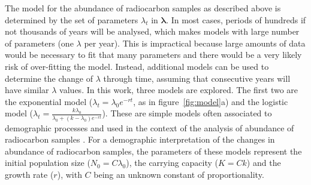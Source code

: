 \documentclass[a4paper]{article}
\begin{document}
The model for the abundance of radiocarbon samples as described above is determined by the set of parameters $\lambda_t$ in $\bm{\lambda}$. In most cases, periods of hundreds if not thousands of years will be analysed, which makes models with large number of parameters (one $\lambda$ per year). This is impractical because large amounts of data would be necessary to fit that many parameters and there would be a very likely risk of over-fitting the model. Instead, additional models can be used to determine the change of $\lambda$ through time, assuming that consecutive years will have similar $\lambda$ values. In this work, three models are explored. The first two are the exponential model ($\lambda_t = \lambda_0 e^{-rt}$, as in figure~\ref{fig:model}a) and the logistic model ($\lambda_t = \frac{k\lambda_0}{\lambda_0+(k-\lambda_0)e^{-rt}}$). These are simple models often associated to demographic processes and used in the context of the analysis of abundance of radiocarbon samples \parencite[\emph{e.g.}][]{Bevan2017a}. For a demographic interpretation of the changes in abundance of radiocarbon samples, the parameters of these models represent the initial population size ($N_0 = C \lambda_0$), the carrying capacity ($K = C k$) and the growth rate ($r$), with $C$ being an unknown constant of proportionality.
\\

\end{document}
